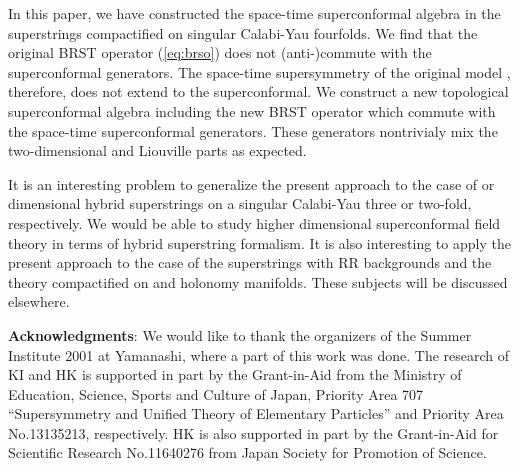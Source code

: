 \documentclass[a4paper,12pt]{article}
\begin{document}
In this paper, we have constructed the space-time \coordHE{}
superconformal algebra in the superstrings compactified
on singular Calabi-Yau fourfolds. We find that the original
BRST operator (\ref{eq:brso}) does not (anti-)commute with the 
superconformal
generators. The space-time supersymmetry of the original model
\cite{GKP}, therefore, does not extend to the superconformal.
We construct a new topological \coordHE{} superconformal algebra
including the new BRST operator which commute with
the space-time superconformal generators. These generators
nontrivialy mix the two-dimensional and Liouville parts
as expected.

It is an interesting problem to generalize the present approach to the
case of \coordHE{} or \coordHE{} dimensional hybrid superstrings on a singular
Calabi-Yau three or two-fold, respectively. 
We would be able to study higher dimensional
superconformal field theory in terms of hybrid superstring formalism.
It is also interesting to apply the present approach to the case of 
the superstrings with RR backgrounds \cite{BeVaWi}
and the theory compactified on
\coordHE{} and \coordHE{} holonomy manifolds\cite{ShVa}. 
These subjects will be discussed elsewhere.

\vspace{1cm}
{\bf Acknowledgments}:
We would like to thank the organizers of the Summer Institute 2001 at 
Yamanashi, where a part of this work was done.
The research of KI and HK is supported in part by the Grant-in-Aid from
the Ministry of Education, Science, Sports and Culture of Japan,
Priority Area 707 ``Supersymmetry and Unified Theory of Elementary
Particles'' and Priority Area No.13135213, respectively. HK is also
supported in part by the Grant-in-Aid for Scientific Research No.11640276
from Japan Society for Promotion of Science.
\end{document}
